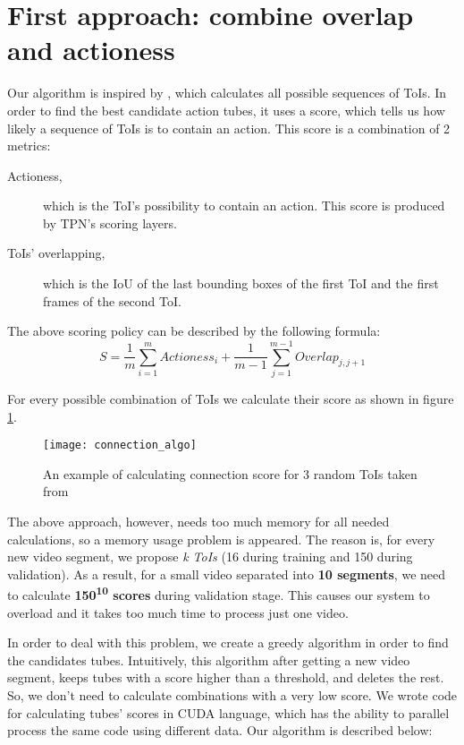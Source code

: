 \section{First approach: combine overlap and actioness}
Our algorithm is inspired by \cite{DBLP:journals/corr/HouCS17}, which calculates all possible sequences of ToIs. In order to find the best candidate action tubes,
it uses a score, which tells us how likely a sequence of ToIs is  to contain an action. This score is a combination of 2 metrics:
\begin{description}
\item[ Actioness,  ] which is the ToI's possibility to contain an action. This score is produced by TPN's scoring layers.
\item [ ToIs' overlapping, ] which is the IoU of the last bounding boxes of the first ToI and the first frames of the second ToI.
\end{description}

The above scoring policy can be described by the following formula:
\[ S = \frac{1}{m} \sum_ {i=1}^{m} Actioness_i + \frac{1}{m-1} \sum_{j=1}^{m-1} Overlap_{j,j+1} \]

For every possible combination of ToIs we calculate their score as shown in figure \ref{fig:connection_algo}.

\begin{figure}[h]
  \centering
  \texttt{[image: connection\_algo]}
  \caption{An example of calculating connection score for 3 random ToIs taken from \cite{DBLP:journals/corr/HouCS17}}
  \label{fig:connection_algo}
\end{figure}

The above approach, however, needs too much memory for all needed calculations, so a memory usage  problem is
appeared. The reason is, for every new video segment, we propose \textit{k ToIs} (16 during training and 150 during validation).
As a result, for a small video separated into  \textbf{10 segments}, we need to calculate 
\textbf{  150\textsuperscript{10} scores} during validation stage. This causes our system to overload and it takes too much time to process
just one video. \par

In order to deal with this problem, we create a greedy algorithm in order to find the candidates tubes. Intuitively, this algorithm after
getting  a new video segment, keeps tubes with a score higher than a threshold, and deletes the rest. So, we don't need to calculate combinations with a
very low score. We wrote code for calculating tubes' scores in CUDA language, which has the ability to
parallel process the same code using different data. Our algorithm is described below:

